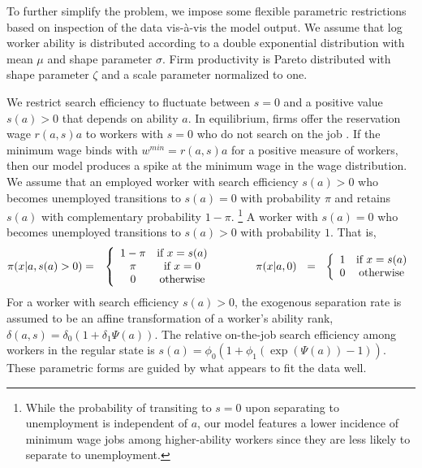 To further simplify the problem, we impose some flexible parametric restrictions based on inspection of the data vis-{\`{a}}-vis the model output. We assume that log worker ability is distributed according to a double exponential distribution with mean $\mu$ and shape parameter $\sigma$. Firm productivity is Pareto distributed with shape parameter $\zeta$ and a scale parameter normalized to one.

We restrict search efficiency to fluctuate between $s = 0$ and a positive value $s(a)>0$ that depends on ability $a$. In equilibrium, firms offer the reservation wage $r(a,s)a$ to workers with $s=0$ who do not search on the job \citep{Diamond1971}. If the minimum wage binds with $w^{min} = r(a,s)a$ for a positive measure of workers, then our model produces a spike at the minimum wage in the wage distribution. We assume that an employed worker with search efficiency $s(a)>0$ who becomes unemployed transitions to $s(a)=0$ with probability $\pi$ and retains $s(a)$ with complementary probability $1-\pi$.%
%
\footnote{While the probability of transiting to $s=0$ upon separating to unemployment is independent of $a$, our model features a lower incidence of minimum wage jobs among higher-ability workers since they are less likely to separate to unemployment.} %
%
A worker with $s(a)=0$ who becomes unemployed transitions to $s(a) > 0$ with probability $1$. That is,
%
\begin{eqnarray*}
  \pi(x|a,s(a)>0) &=& \left\{ \begin{array}{cc} 1-\pi & \text{if } x = s(a) \\ \pi & \text{if } x = 0 \\ 0 & \text{otherwise} \end{array} \right. \hspace{.5in} \pi(x|a,0) \ \ = \ \ \left\{ \begin{array}{cc} 1 & \text{if } x = s(a) \\ 0 & \text{otherwise} \end{array} \right.
\end{eqnarray*}
%
For a worker with search efficiency $s(a)>0$, the exogenous separation rate is assumed to be an affine transformation of a worker's ability rank, $\delta(a,s)=\delta_0(1 +\delta_1 \Psi(a))$. The relative on-the-job search efficiency among workers in the regular state is $s(a)=\phi_0(1+\phi_1 (\exp(\Psi(a))-1))$. These parametric forms are guided by what appears to fit the data well.

